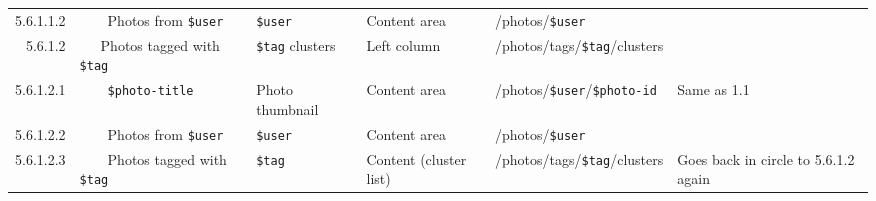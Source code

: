 \documentclass[11pt,a4paper]{article}
\newcommand{\var}[1]{\texttt{\${#1}}}
\begin{document}
\begin{landscape}
\begin{table}[h!b!p!]
\begin{center}
\begin{tiny}
\begin{tabular}{r|l|l|l|l|p{3cm}}
                    5.6.1.1.2 &
                    ~~~~Photos from \var{user} &
                    \var{user} &
                    Content area &
                    /photos/\var{user} &
                    \\

                  5.6.1.2 &
                  ~~~Photos tagged with \var{tag} &
                  \var{tag} clusters &
                  Left column &
                  /photos/tags/\var{tag}/clusters &
                  \\

                    5.6.1.2.1 &
                    ~~~~\var{photo-title} &
                    Photo thumbnail &
                    Content area &
                    /photos/\var{user}/\var{photo-id} &
                    Same as 1.1 \\

                    5.6.1.2.2 &
                    ~~~~Photos from \var{user} &
                    \var{user} &
                    Content area &
                    /photos/\var{user} &
                    \\

                    5.6.1.2.3 &
                    ~~~~Photos tagged with \var{tag} &
                    \var{tag} &
                    Content (cluster list) &
                    /photos/tags/\var{tag}/clusters &
                    Goes back in circle to 5.6.1.2 again \\

          \end{tabular}
        \rm
      \end{tiny}
    \end{center}
  \end{table}
\end{landscape}
\end{document}
